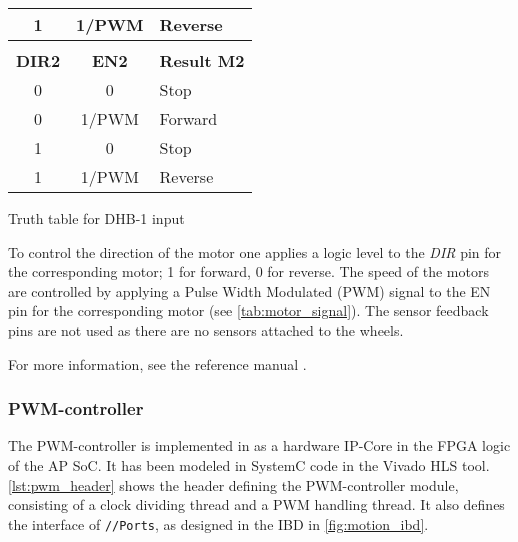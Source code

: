 \documentclass[Main]{subfiles}
\begin{document}
\begin{table}[H]
\begin{subtable}[b]{0.3\linewidth}
\begin{tabular}{ccl}
						\multicolumn{1}{|c|}{1}          & \multicolumn{1}{c|}{1/PWM}     & \multicolumn{1}{l|}{Reverse}         \\ \hline
						                                 &                                &                                      \\ \hline
						\multicolumn{1}{|c|}{{\bf DIR2}} & \multicolumn{1}{c|}{{\bf EN2}} & \multicolumn{1}{l|}{{\bf Result M2}} \\ \hline
						\multicolumn{1}{|c|}{0}          & \multicolumn{1}{c|}{0}         & \multicolumn{1}{l|}{Stop}            \\ \hline
						\multicolumn{1}{|c|}{0}          & \multicolumn{1}{c|}{1/PWM}     & \multicolumn{1}{l|}{Forward}         \\ \hline
						\multicolumn{1}{|c|}{1}          & \multicolumn{1}{c|}{0}         & \multicolumn{1}{l|}{Stop}            \\ \hline
						\multicolumn{1}{|c|}{1}          & \multicolumn{1}{c|}{1/PWM}     & \multicolumn{1}{l|}{Reverse}         \\ \hline
					\end{tabular}
					\caption{Truth table for DHB-1 input}
					\label{tab:motor_signal}
				\end{subtable}
				\caption{} 
			\end{table} 

			To control the direction of the motor one applies a logic level to the \emph{DIR} pin for the corresponding motor; 1 for forward, 0 for reverse.
			The speed of the motors are controlled by applying a Pulse Width Modulated (PWM) signal to the EN pin for the corresponding motor (see \autoref{tab:motor_signal}).
			The sensor feedback pins are not used as there are no sensors attached to the wheels.

			For more information, see the reference manual \cite{Digilent2013}.


		\subsubsection{PWM-controller} %
		\label{ssub:pwm_controller}
			
			The PWM-controller is implemented in as a hardware IP-Core in the FPGA logic of the AP SoC.
			It has been modeled in SystemC code in the Vivado HLS tool.
			\autoref{lst:pwm_header} shows the header defining the PWM-controller module, consisting of a clock dividing thread and a PWM handling thread.
			It also defines the interface of \texttt{//Ports}, as designed in the IBD in \autoref{fig:motion_ibd}.
\end{document}
